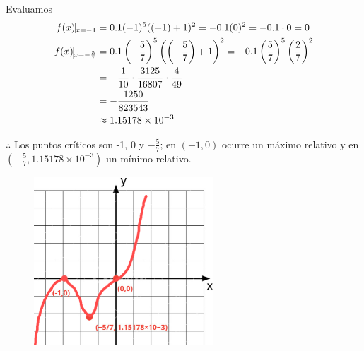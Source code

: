 \documentclass[12pt]{article}
\begin{document}
Evaluamos
\begin{align*}
  f(x)\vline_{x=-1}
  &=0.1(-1)^5 ((-1) + 1)^2
  =-0.1 (0)^2
  =-0.1\cdot 0
  = 0\\
  f(x)\vline_{x=-\frac{5}{7}}
  &=0.1\left(-\frac{5}{7}\right)^5 \left(\left(-\frac{5}{7}\right) + 1\right)^2
  =-0.1\left(\frac{5}{7}\right)^5 \left(\frac{2}{7}\right)^2\\
  &=-\frac{1}{10} \cdot \frac{3125}{16807} \cdot \frac{4}{49} \\
  &= -\frac{1250}{823543}\\
  & \approx 1.15178 \times 10^{-3}
\end{align*}

$\therefore $ Los puntos críticos son -1, 0 y $-\frac{5}{7}$; en $(-1,0)$ ocurre un máximo relativo y en $\left(-\frac{5}{7}, 1.15178 \times 10^{-3} \right)$ un mínimo relativo.
\begin{figure}[H]
\centering
\includegraphics[width=0.6\textwidth]{../img/img_Lista3/2_70_last.png}
\end{figure}
\end{document}
